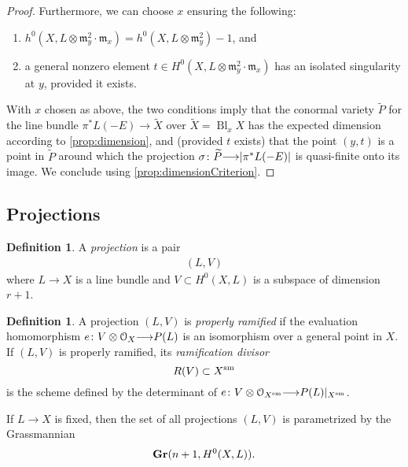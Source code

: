 \documentclass[11pt,reqno]{amsart}
\theoremstyle{plain}
\theoremstyle{definition}
\newtheorem{definition}[theorem]{Definition}
\theoremstyle{remark}
\numberwithin{equation}{section}
\DeclareMathOperator{\Bl}{Bl}
\newcommand{\cO}{{\mathcal O}}
\renewcommand{\to}{{\longrightarrow}}
\numberwithin{equation}{section}
\begin{document}
\begin{proof}
Furthermore, we can choose $x$ ensuring the following: 
\begin{enumerate}
  \item  $h^{0}(X,  L \otimes {\mathfrak m}^{2}_{y}\cdot {\mathfrak m}_{x}) = h^{0}(X,  L \otimes {\mathfrak{m}^{2}_{y}}) - 1$, and
  \item a general nonzero element $t \in  H^{0}(X, L \otimes{\mathfrak m}^{2}_{y}\cdot {\mathfrak m}_{x})$ has an isolated singularity at $y$, provided it exists.
 \end{enumerate}

 With $x$ chosen as above, the two conditions imply that the conormal variety
 $\widetilde{P}$ for the line bundle $\pi^{*}L(-E) \to {\widetilde{X}}$ over
 $\widetilde{X} = \Bl_{x}X$ has the expected dimension according to \autoref{prop:dimension}, and (provided $t$ exists) that the point $(y,t)$ is a point in $\widetilde{P}$ around which the projection $\sigma\from \widetilde{P} \to |\pi^{*}L(-E)|$ is quasi-finite onto its image. We conclude using \autoref{prop:dimensionCriterion}.
\end{proof}

\subsection{Projections}

\begin{definition}
A {\sl projection} is a pair 
\begin{align*}
  (L,V)
\end{align*}
where  $L \to X$ is a line bundle and $V \subset H^{0}(X,L)$ is a subspace of dimension $r+1$.  
\end{definition}

\begin{definition}
  \label{definition:properlyramified}
  A projection $(L,V)$ is {\sl properly ramified} if the evaluation homomorphism $e\from V \otimes \cO_{X} \to P(L)$ is an isomorphism over a general point in $X$.  If $(L,V)$ is properly ramified, its {\sl ramification divisor} $$R(V) \subset X^{\rm sm}$$ is the scheme defined by the determinant of $e \from V \otimes \cO_{X^{\rm sm}} \to P(L)|_{X^{\rm sm}}$.
\end{definition}

If $L \to X$ is fixed, then the set of all projections $(L,V)$ is parametrized by the Grassmannian 
\begin{align*}
  {\bf Gr}(n+1, H^{0}(X,L)).
\end{align*}
\end{document}
